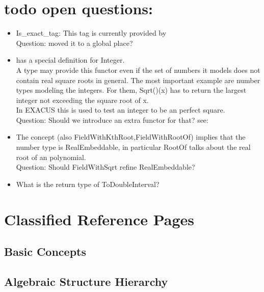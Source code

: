 


\section{todo open questions:}

\begin{itemize} 
\item Is\_exact\_tag: This tag is currently provided by \\
Question: moved it to a global place? 
\item {} has a special definition for Integer. \\
        A type may provide this functor even if the set of 
        numbers it models does not contain real square roots in general. 
        The most important example are number types modeling the integers. 
        For them, Sqrt()(x) has to return the largest integer not exceeding 
        the square root of x.\\
        In EXACUS this is used to test an integer to be an perfect square. \\
        Question: Should we introduce an extra functor for that?
        see: 
\item The concept  (also FieldWithKthRoot,FieldWithRootOf) 
      implies that the number type is RealEmbeddable, in particular RootOf talks 
      about the real root of an polynomial.\\
      Question: Should FieldWithSqrt refine RealEmbeddable?  
\item What is the return type of ToDoubleInterval?     
\end{itemize}

\section{Classified Reference Pages}

\subsection*{Basic Concepts}

\subsection*{ Algebraic Structure Hierarchy}

